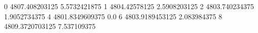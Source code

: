 0 4807.408203125 5.5732421875
1 4804.42578125 2.5908203125
2 4803.740234375 1.9052734375
4 4801.8349609375 0.0
6 4803.9189453125 2.083984375
8 4809.3720703125 7.537109375
